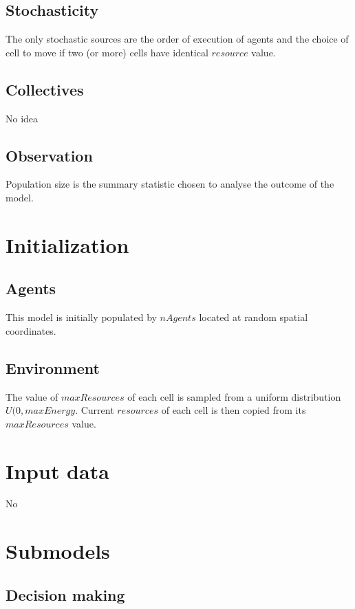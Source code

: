 \documentclass[11pt,a4paper,twocolumn,notitlepage]{article}
\begin{document}
\subsection{Stochasticity}

The only stochastic sources are the order of execution of agents and the choice of cell to move if two (or more) cells have identical $resource$ value.

\subsection{Collectives}

No idea

\subsection{Observation}

Population size is the summary statistic chosen to analyse the outcome of the model.

\section{Initialization}

\subsection{Agents}

This model is initially populated by $nAgents$ located at random spatial coordinates.

\subsection{Environment}

The value of $maxResources$ of each cell is sampled from a uniform distribution $U(0,maxEnergy$. Current $resources$ of each cell is then copied from its $maxResources$ value.

\section{Input data}

No

\section{Submodels}

\subsection{Decision making}
\end{document}

